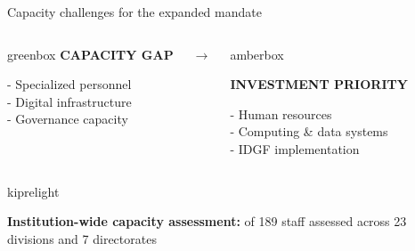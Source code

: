 \documentclass[aspectratio=169,11pt]{beamer}
\begin{document}
\begin{frame}{Capacity challenges for the expanded mandate}
\begin{columns}[T,totalwidth=\textwidth]
\begin{beamercolorbox}[
    wd=\textwidth,
    ht=3.25cm,
    dp=0.15cm,
    sep=0.46cm,
    rounded=true
]{greenbox}
\textcolor{execgreen}{\large\textbf{CAPACITY GAP}}

\vspace{0.16cm}

{\normalsize
- Specialized personnel\\
- Digital infrastructure\\
- Governance capacity
}

\end{beamercolorbox}



\vspace{1.25cm}

\centering
{\Large\textcolor{kipregrey}{$\longrightarrow$}}



\begin{beamercolorbox}[
    wd=\textwidth,
    ht=3.25cm,
    dp=0.15cm,
    sep=0.16cm,
    rounded=true
]{amberbox}

\textcolor{execamber}{\large\textbf{INVESTMENT PRIORITY}}

\vspace{0.16cm}

{\normalsize
- Human resources\\
- Computing \& data systems\\
- IDGF implementation
}

\end{beamercolorbox}

\end{columns}

\vspace{0.28cm}


\begin{beamercolorbox}[
    wd=\textwidth,
    sep=0.13cm,
    rounded=true
]{kiprelight}

\centering
{\normalsize
\textbf{Institution-wide capacity assessment:}
 of 189 staff assessed across 23 divisions and 7 directorates
}


\end{beamercolorbox}
\end{frame}
\end{document}
